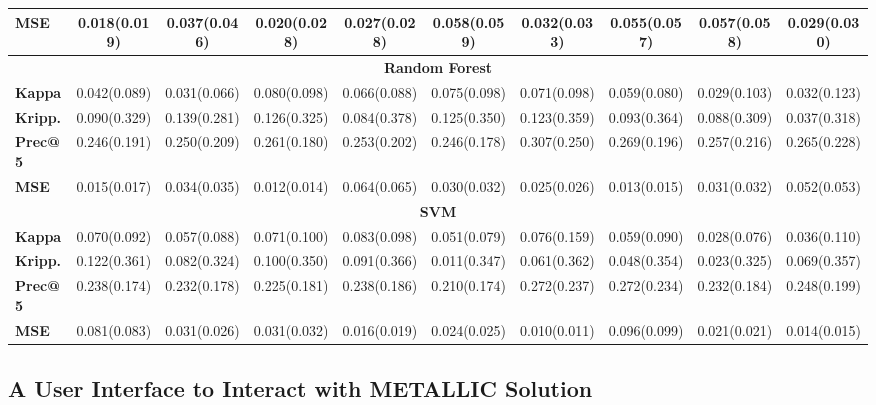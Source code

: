 \documentclass{article}
\begin{document}
\begin{sidewaystable}[!htbp]
\begin{tabular}{@{}lccccccccc@{}}
\textbf{MSE} & 0.018(0.019) & 0.037(0.046) & 0.020(0.028) & 0.027(0.028) & 0.058(0.059) & 0.032(0.033) & 0.055(0.057) & 0.057(0.058) & 0.029(0.030) \\
\midrule
\multicolumn{10}{c}{\textbf{Random Forest}}\\
\midrule
\textbf{Kappa} & 0.042(0.089) & 0.031(0.066) & 0.080(0.098) & 0.066(0.088) & 0.075(0.098) & 0.071(0.098) & 0.059(0.080) & 0.029(0.103) & 0.032(0.123) \\
\textbf{Kripp.} & 0.090(0.329) & 0.139(0.281) & 0.126(0.325) & 0.084(0.378) & 0.125(0.350) & 0.123(0.359) & 0.093(0.364) & 0.088(0.309) & 0.037(0.318) \\
\textbf{Prec@5} & 0.246(0.191) & 0.250(0.209) & 0.261(0.180) & 0.253(0.202) & 0.246(0.178) & 0.307(0.250) & 0.269(0.196) & 0.257(0.216) & 0.265(0.228) \\
\textbf{MSE} & 0.015(0.017) & 0.034(0.035) & 0.012(0.014) & 0.064(0.065) & 0.030(0.032) & 0.025(0.026) & 0.013(0.015) & 0.031(0.032) & 0.052(0.053) \\
\midrule
\multicolumn{10}{c}{\textbf{SVM}}\\
\midrule
\textbf{Kappa} & 0.070(0.092) & 0.057(0.088) & 0.071(0.100) & 0.083(0.098) & 0.051(0.079) & 0.076(0.159) & 0.059(0.090) & 0.028(0.076) & 0.036(0.110) \\
\textbf{Kripp.} & 0.122(0.361) & 0.082(0.324) & 0.100(0.350) & 0.091(0.366) & 0.011(0.347) & 0.061(0.362) & 0.048(0.354) & 0.023(0.325) & 0.069(0.357) \\
\textbf{Prec@5} & 0.238(0.174) & 0.232(0.178) & 0.225(0.181) & 0.238(0.186) & 0.210(0.174) & 0.272(0.237) & 0.272(0.234) & 0.232(0.184) & 0.248(0.199) \\
\textbf{MSE} & 0.081(0.083) & 0.031(0.026) & 0.031(0.032) & 0.016(0.019) & 0.024(0.025) & 0.010(0.011) & 0.096(0.099) & 0.021(0.021) & 0.014(0.015) \\
\bottomrule
\end{tabular}
\end{sidewaystable}




\subsection{A User Interface to Interact with METALLIC Solution}\label{sec:res3}
\end{document}
